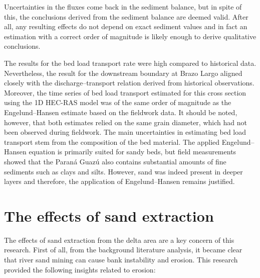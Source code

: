 Uncertainties in the fluxes come back in the sediment balance, but in spite of this, the conclusions derived from the sediment balance are deemed valid. After all, any resulting effects do not depend on exact sediment values and in fact an estimation with a correct order of magnitude is likely enough to derive qualitative conclusions. 

The results for the bed load transport rate were high compared to historical data. Nevertheless, the result for the downstream boundary at Brazo Largo aligned closely with the discharge–transport relation derived from historical observations. Moreover, the time series of bed load transport estimated for this cross section using the 1D HEC-RAS model was of the same order of magnitude as the Engelund–Hansen estimate based on the fieldwork data. It should be noted, however, that both estimates relied on the same grain diameter, which had not been observed during fieldwork. The main uncertainties in estimating bed load transport stem from the composition of the bed material. The applied Engelund–Hansen equation is primarily suited for sandy beds, but field measurements showed that the Paraná Guazú also contains substantial amounts of fine sediments such as clays and silts. However, sand was indeed present in deeper layers and therefore, the application of Engelund–Hansen remains justified.

\section{The effects of sand extraction}
The effects of sand extraction from the delta area are a key concern of this research. First of all, from the background literature analysis, it became clear that river sand mining can cause bank instability and erosion. This research provided the following insights related to erosion:

